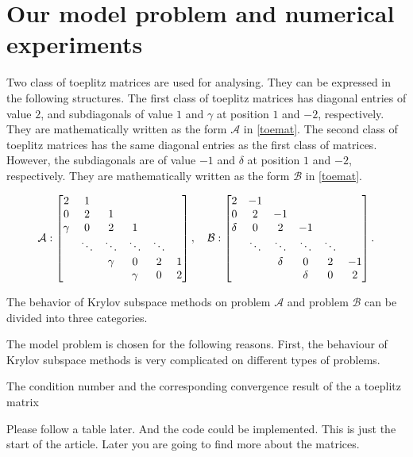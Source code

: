 \section{Our model problem and numerical experiments}

Two class of toeplitz matrices are used for analysing. They can be expressed in the following structures.
The first class of toeplitz matrices has diagonal entries of value $2$, and subdiagonals of value $1$ and $\gamma$ at position $1$ and $-2$, respectively. They are mathematically written as the form $\mathcal{A}$ in \eqref{toemat}.
The second class of toeplitz matrices has the same diagonal entries as the first class of matrices. However, the subdiagonals are of value $-1$ and $\delta$ at position $1$ and $-2$, respectively. They are mathematically written as the form $\mathcal{B}$ in \eqref{toemat}.

\begin{equation}\label{toemat}
	\mathcal{A}: \begin{bmatrix}
	2 & 1& & & & \\
	0& 2& 1& & & \\
	\gamma&0 & 2& 1& & \\
	& \ddots&\ddots & \ddots& \ddots& \\
	& & \gamma&0 & 2& 1\\
	& & & \gamma& 0& 2
\end{bmatrix},
\quad
\mathcal{B}:
\begin{bmatrix}
	2 & -1& & & & \\
	0& 2& -1& & & \\
	\delta&0 & 2& -1& & \\
	& \ddots&\ddots & \ddots& \ddots& \\
	& & \delta&0 & 2& -1\\
	& & & \delta& 0& 2
\end{bmatrix}
.
\end{equation}

The behavior of Krylov subspace methods on problem $\mathcal{A}$ and problem $\mathcal{B}$ can be divided into three categories.

The model problem is chosen for the following reasons. First, the behaviour of Krylov subspace methods is very complicated on different types of problems.

The condition number and the corresponding convergence result of the a toeplitz matrix

Please follow a table later. And the code could be implemented. This is just the start of the article. Later you are going to find more about the matrices.

